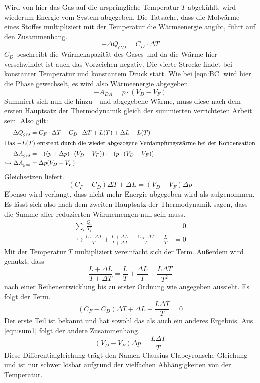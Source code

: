 Wird von hier das Gas auf die ursprüngliche Temperatur $T$ abgekühlt, wird wiederum Energie vom System abgegeben.
Die Tatsache, dass die Molwärme eines Stoffes multipliziert mit der Temperatur die Wärmeenergie angibt, führt auf den Zusammenhang.
\begin{equation}
    -\Delta Q_{CD} = C_D \cdot \Delta T
\end{equation}
$C_D$ beschreibt die Wärmekapazität des Gases und da die Wärme hier verschwindet ist auch das Vorzeichen negativ.
Die vierte Strecke findet bei konstanter Temperatur und konstantem Druck statt. Wie bei \eqref{eqn:BC} wird hier die Phase gewechselt, es wird also Wärmeenergie 
abgegeben.
\begin{equation}
    -A_{DA} = p \cdot (V_D - V_F)
\end{equation}
Summiert sich nun die hinzu - und abgegebene Wärme, muss diese nach dem ersten Hauptsatz der Thermodynamik gleich der summierten verrichteten Arbeit sein.
Also gilt:
\begin{align*}
     \Delta Q_{ges} &= C_F \cdot \Delta T - C_D \cdot \Delta T + L(T) + \Delta L - L(T) \\
     \intertext{Das $-L(T)$ entsteht durch die wieder abgezogene Verdampfungswärme bei der Kondensation}
    \Delta A_{ges} &= -((p+ \Delta p) \cdot (V_D-V_F)) \cdot -(p \cdot (V_D - V_F)) \\
    \hookrightarrow \Delta A_{ges} &= \Delta p (V_D - V_F) 
\end{align*}
Gleichsetzen liefert.
\begin{equation}
    \label{eqn:sum1}
    (C_F-C_D)\Delta T + \Delta L = (V_D - V_F) \Delta p
\end{equation}
Ebenso wird verlangt, dass nicht mehr Energie abgegeben wird als aufgenommen. Es lässt sich also nach dem zweiten Hauptsatz der Thermodynamik
sagen, dass die Summe aller reduzierten Wärmemengen null sein muss.
\begin{align}
\label{eqn:sum}
    \sum_i \frac{Q_i}{T_i} &= 0 \\
    \hookrightarrow \frac{C_F \cdot\Delta T}{T} + \frac{L + \Delta L}{T+ \Delta T}-\frac{C_D \cdot \Delta T}{T}-\frac{L}{T} &= 0
\end{align}
Mit der Temperatur $T$ multipliziert vereinfacht sich der Term. Außerdem wird genutzt, dass 
\begin{equation*}
    \frac{L+ \Delta L}{T + \Delta T} = \frac{L}{T} + \frac{\Delta L}{T} - \frac{L \Delta T}{T^2}
\end{equation*}
nach einer Reihenentwicklung bis zu erster Ordnung wie angegeben aussieht. Es folgt der Term.
\begin{equation}
    (C_F - C_D) \Delta T + \Delta L - \frac{L \Delta T}{T} = 0
\end{equation}
Der erste Teil ist bekannt und hat sowohl das als auch ein anderes Ergebnis. Aus \eqref{eqn:sum1} folgt der andere Zusammenhang.
\begin{equation}
    \label{eqn:dgl}
    (V_D-V_F) \Delta p = \frac{L \Delta T}{T}
\end{equation}  
Diese Differentialgleichung trägt den Namen Clausius-Clapeyronsche Gleichung und ist nur schwer lösbar aufgrund der vielfachen Abhängigkeiten von der 
Temperatur.


